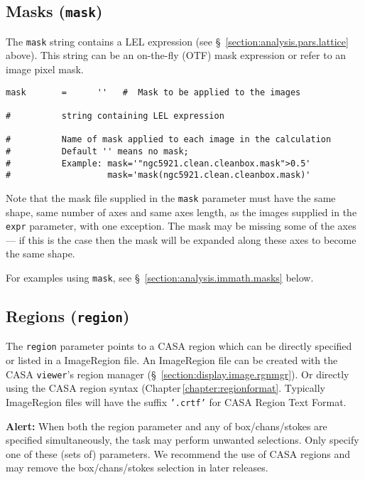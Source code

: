 \subsection{Masks ({\tt mask})}
\label{section:analysis.pars.mask}

The {\tt mask} string contains a LEL expression 
(see \S~\ref{section:analysis.pars.lattice} above).  This string
can be an on-the-fly (OTF) mask expression or refer to an 
image pixel mask.
\small
\begin{verbatim}
mask       =      ''   #  Mask to be applied to the images

#          string containing LEL expression

#          Name of mask applied to each image in the calculation
#          Default '' means no mask;  
#          Example: mask='"ngc5921.clean.cleanbox.mask">0.5'
#                   mask='mask(ngc5921.clean.cleanbox.mask)'
\end{verbatim}
\normalsize

Note that the mask file supplied in the {\tt mask} parameter must have
the same shape, same number of axes and same axes length, as the
images supplied in the {\tt expr} parameter, with one exception. The mask
may be missing some of the axes --- if this is the case then the mask
will be expanded along these axes to become the same shape.

For examples using {\tt mask}, see \S~\ref{section:analysis.immath.masks} 
below.


\subsection{Regions ({\tt region})}
\label{section:analysis.pars.regions}

The {\tt region} parameter points to a CASA region which can be
directly specified or listed in a ImageRegion file.  An
ImageRegion file can be created with the CASA {\tt viewer}'s region
manager (\S~\ref{section:display.image.rgnmgr}). Or directly using the
CASA region syntax (Chapter\,\ref{chapter:regionformat}.
Typically ImageRegion files will have the suffix {\tt '.crtf'} for
CASA Region Text Format.  

{\bf Alert:} When both the region parameter and any of
box/chans/stokes are specified simultaneously, the task may perform
unwanted selections. Only specify one of these (sets of)
parameters. We recommend the use of CASA regions and may remove the
box/chans/stokes selection in later releases. 


